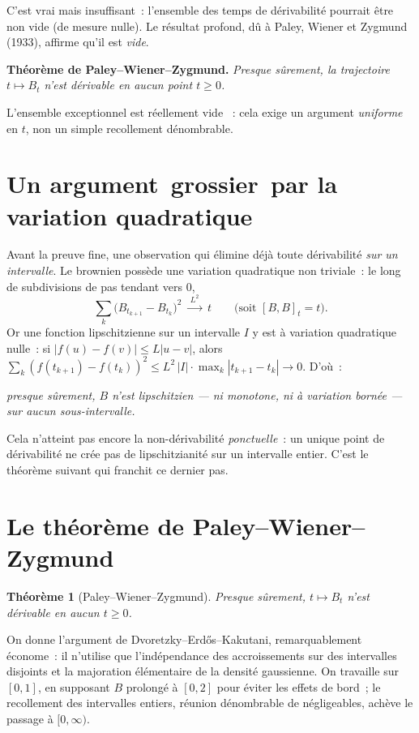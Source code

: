 \documentclass[11pt,a4paper]{article}
\providecommand{\og}{\guillemotleft\,}
\providecommand{\fg}{\,\guillemotright}
\theoremstyle{plain}
\newtheorem{theoreme}{Théorème}
\theoremstyle{definition}
\newcommand{\abs}[1]{\left\lvert #1 \right\rvert}
\newcommand{\ps}{\text{p.s.}}
\begin{document}
C'est vrai mais insuffisant~: l'ensemble des temps de d\'erivabilit\'e pourrait \^etre non vide (de mesure nulle). Le r\'esultat profond, d\^u \`a Paley, Wiener et Zygmund (1933), affirme qu'il est \emph{vide}.

\begin{resultat}
\textbf{Th\'eor\`eme de Paley--Wiener--Zygmund.} \emph{Presque s\^urement, la trajectoire $t\mapsto B_t$ n'est d\'erivable en aucun point $t\ge 0$.}
\end{resultat}

L'ensemble exceptionnel est r\'eellement vide \ps{}~: cela exige un argument \emph{uniforme} en $t$, non un simple recollement d\'enombrable.

\section{Un argument \og grossier\fg{} par la variation quadratique}

Avant la preuve fine, une observation qui \'elimine d\'ej\`a toute d\'erivabilit\'e \emph{sur un intervalle}. Le brownien poss\`ede une variation quadratique non triviale~: le long de subdivisions de pas tendant vers $0$,
\[
\sum_{k}\bigl(B_{t_{k+1}}-B_{t_k}\bigr)^2 \;\xrightarrow{\;L^2\;}\; t
\qquad\text{(soit }[B,B]_t=t\text{)}.
\]
Or une fonction lipschitzienne sur un intervalle $I$ y est \`a variation quadratique nulle~: si $\abs{f(u)-f(v)}\le L\abs{u-v}$, alors $\sum_k (f(t_{k+1})-f(t_k))^2\le L^2\,\lvert I\rvert\cdot\max_k\abs{t_{k+1}-t_k}\to 0$. D'o\`u~:
\begin{center}
\itshape presque s\^urement, $B$ n'est lipschitzien --- ni monotone, ni \`a variation born\'ee --- sur aucun sous-intervalle.
\end{center}
Cela n'atteint pas encore la non-d\'erivabilit\'e \emph{ponctuelle}~: un unique point de d\'erivabilit\'e ne cr\'ee pas de lipschitzianit\'e sur un intervalle entier. C'est le th\'eor\`eme suivant qui franchit ce dernier pas.

\section{Le th\'eor\`eme de Paley--Wiener--Zygmund}

\begin{theoreme}[Paley--Wiener--Zygmund]\label{th:pwz}
Presque s\^urement, $t\mapsto B_t$ n'est d\'erivable en aucun $t\ge 0$.
\end{theoreme}

On donne l'argument de Dvoretzky--Erd\H{o}s--Kakutani, remarquablement \'econome~: il n'utilise que l'ind\'ependance des accroissements sur des intervalles disjoints et la majoration \'el\'ementaire de la densit\'e gaussienne. On travaille sur $[0,1]$, en supposant $B$ prolong\'e \`a $[0,2]$ pour \'eviter les effets de bord~; le recollement des intervalles entiers, r\'eunion d\'enombrable de n\'egligeables, ach\`eve le passage \`a $[0,\infty)$.
\end{document}
